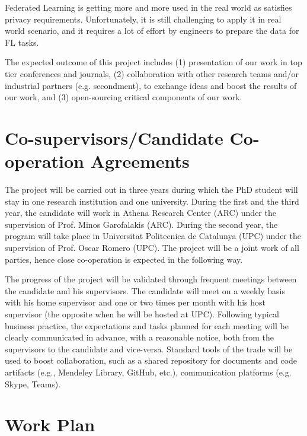 \documentclass[12pt]{article}
\begin{document}
Federated Learning is getting more and more used in the real world as satisfies privacy requirements. 
Unfortunately, it is still challenging to apply it in real world scenario, and it requires a lot of effort by 
engineers to prepare the data for FL tasks. 

The expected outcome of this project includes (1) presentation of our work in top tier conferences
and journals, (2) collaboration with other research teams and/or industrial partners (e.g. secondment), to
exchange ideas and boost the results of our work, and (3) open-sourcing critical components of our work.

\section{Co-supervisors/Candidate Co-operation Agreements}
The project will be carried out in three years during which the PhD student will stay in one research institution and one university. During the first and the third year, the candidate will work in Athena Research Center (ARC) under the supervision of Prof. Minos Garofalakis (ARC). During the second year, the program
will take place in Universitat Politecnica de Catalunya (UPC) under the supervision of Prof. Oscar Romero (UPC). The project will be a joint work of all parties, hence close co-operation is expected in the following way.

The progress of the project will be validated through frequent meetings between the candidate and his supervisors. The candidate will meet on a weekly basis with his home supervisor and one or two times per month with his host supervisor (the opposite when he will be hosted at UPC). Following typical business practice, the expectations and tasks planned for each meeting will be clearly communicated in advance, with a reasonable notice, both from the supervisors to the candidate and vice-versa. Standard tools of the trade will be used to boost collaboration, such
as a shared repository for documents and code artifacts (e.g., Mendeley Library, GitHub, etc.), communication platforms (e.g. Skype, Teams).


\section{Work Plan}
\end{document}
